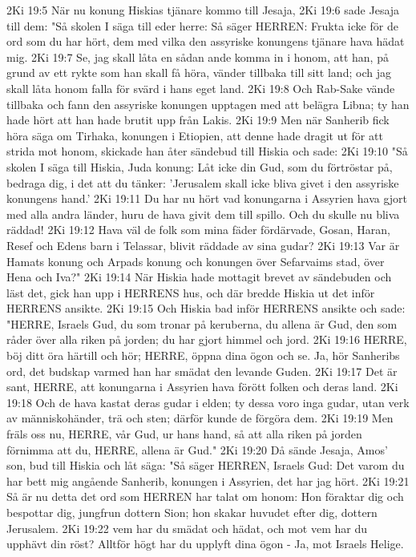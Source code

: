 2Ki 19:5  När nu konung Hiskias tjänare kommo till Jesaja,
2Ki 19:6  sade Jesaja till dem: "Så skolen I säga till eder herre: Så säger HERREN: Frukta icke för de ord som du har hört, dem med vilka den assyriske konungens tjänare hava hädat mig.
2Ki 19:7  Se, jag skall låta en sådan ande komma in i honom, att han, på grund av ett rykte som han skall få höra, vänder tillbaka till sitt land; och jag skall låta honom falla för svärd i hans eget land.
2Ki 19:8  Och Rab-Sake vände tillbaka och fann den assyriske konungen upptagen med att belägra Libna; ty han hade hört att han hade brutit upp från Lakis.
2Ki 19:9  Men när Sanherib fick höra säga om Tirhaka, konungen i Etiopien, att denne hade dragit ut för att strida mot honom, skickade han åter sändebud till Hiskia och sade:
2Ki 19:10  "Så skolen I säga till Hiskia, Juda konung: Låt icke din Gud, som du förtröstar på, bedraga dig, i det att du tänker: 'Jerusalem skall icke bliva givet i den assyriske konungens hand.'
2Ki 19:11  Du har nu hört vad konungarna i Assyrien hava gjort med alla andra länder, huru de hava givit dem till spillo. Och du skulle nu bliva räddad!
2Ki 19:12  Hava väl de folk som mina fäder fördärvade, Gosan, Haran, Resef och Edens barn i Telassar, blivit räddade av sina gudar?
2Ki 19:13  Var är Hamats konung och Arpads konung och konungen över Sefarvaims stad, över Hena och Iva?"
2Ki 19:14  När Hiskia hade mottagit brevet av sändebuden och läst det, gick han upp i HERRENS hus, och där bredde Hiskia ut det inför HERRENS ansikte.
2Ki 19:15  Och Hiskia bad inför HERRENS ansikte och sade: "HERRE, Israels Gud, du som tronar på keruberna, du allena är Gud, den som råder över alla riken på jorden; du har gjort himmel och jord.
2Ki 19:16  HERRE, böj ditt öra härtill och hör; HERRE, öppna dina ögon och se. Ja, hör Sanheribs ord, det budskap varmed han har smädat den levande Guden.
2Ki 19:17  Det är sant, HERRE, att konungarna i Assyrien hava förött folken och deras land.
2Ki 19:18  Och de hava kastat deras gudar i elden; ty dessa voro inga gudar, utan verk av människohänder, trä och sten; därför kunde de förgöra dem.
2Ki 19:19  Men fräls oss nu, HERRE, vår Gud, ur hans hand, så att alla riken på jorden förnimma att du, HERRE, allena är Gud."
2Ki 19:20  Då sände Jesaja, Amos' son, bud till Hiskia och låt säga: "Så säger HERREN, Israels Gud: Det varom du har bett mig angående Sanherib, konungen i Assyrien, det har jag hört.
2Ki 19:21  Så är nu detta det ord som HERREN har talat om honom: Hon föraktar dig och bespottar dig, jungfrun dottern Sion; hon skakar huvudet efter dig, dottern Jerusalem.
2Ki 19:22  vem har du smädat och hädat, och mot vem har du upphävt din röst? Alltför högt har du upplyft dina ögon - Ja, mot Israels Helige.
